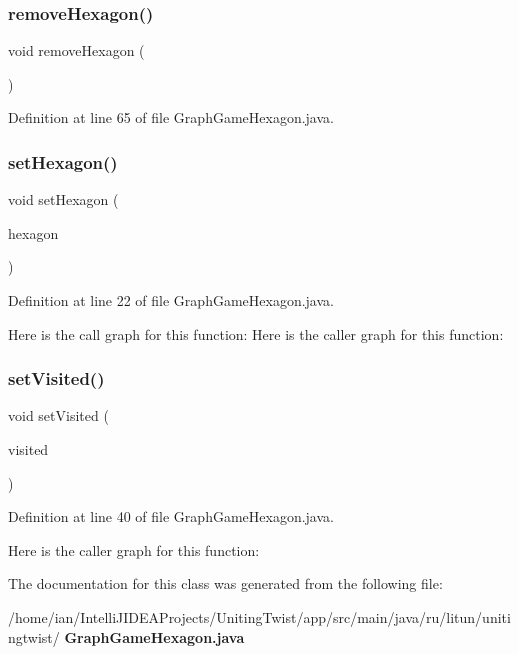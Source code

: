 \subsubsection{remove\+Hexagon()}
{\footnotesize\ttfamily void remove\+Hexagon (\begin{DoxyParamCaption}{ }\end{DoxyParamCaption})}



Definition at line 65 of file Graph\+Game\+Hexagon.\+java.

\mbox{\label{classsf_1_1unitingtwist_1_1_graph_game_hexagon_a31b3633d1829f9a2ffd0082a2061a1c5}} 
\subsubsection{set\+Hexagon()}
{\footnotesize\ttfamily void set\+Hexagon (\begin{DoxyParamCaption}\item[{\textbf{ Game\+Hexagon}}]{hexagon }\end{DoxyParamCaption})}



Definition at line 22 of file Graph\+Game\+Hexagon.\+java.

Here is the call graph for this function\+:
Here is the caller graph for this function\+:
\mbox{\label{classsf_1_1unitingtwist_1_1_graph_game_hexagon_a5e654106f2076606fd907476f80518c6}} 
\subsubsection{set\+Visited()}
{\footnotesize\ttfamily void set\+Visited (\begin{DoxyParamCaption}\item[{boolean}]{visited }\end{DoxyParamCaption})}



Definition at line 40 of file Graph\+Game\+Hexagon.\+java.

Here is the caller graph for this function\+:


The documentation for this class was generated from the following file\+:\begin{DoxyCompactItemize}
\item 
/home/ian/\+Intelli\+J\+I\+D\+E\+A\+Projects/\+Uniting\+Twist/app/src/main/java/ru/litun/unitingtwist/\textbf{ Graph\+Game\+Hexagon.\+java}\end{DoxyCompactItemize}
